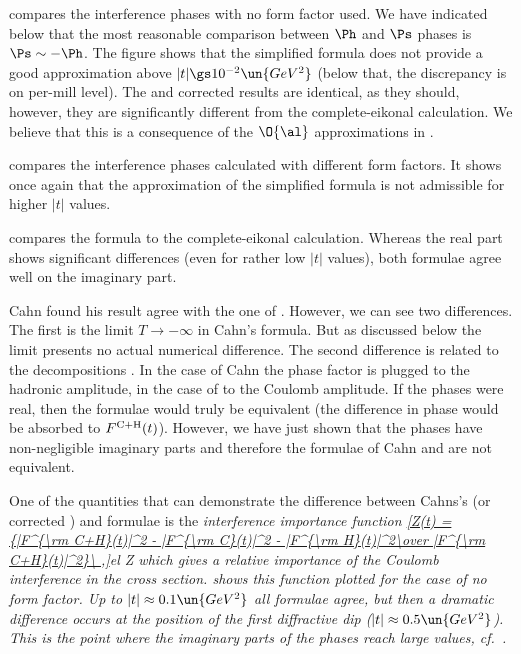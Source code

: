  compares the interference phases with no form factor used. We have indicated below  that the most reasonable comparison between $\Ph$ and $\Ps$ phases is $\Ps \sim - \Ph$. The figure shows that the simplified \WY{} formula does not provide a good approximation above $|t| \gs 10^{-2}\un{GeV^2}$ (below that, the discrepancy is on per-mill level). The \WY{} and corrected \KL{} results are identical, as they should, however, they are significantly different from the complete-eikonal calculation. We believe that this is a consequence of the $\O{\al}$ approximations in .


 compares the interference phases calculated with different form factors. It shows once again that the approximation of the simplified \WaY{} formula is not admissible for higher $|t|$ values.

 compares the \KL{} formula to the complete-eikonal calculation. Whereas the real part shows significant differences (even for rather low $|t|$ values), both formulae agree well on the imaginary part.



Cahn found his result  agree with the one of \WY{} . However, we can see two differences. The first is the limit $T\to -\infty$ in Cahn's formula. But as discussed below  the limit presents no actual numerical difference. The second difference is related to the decompositions . In the case of Cahn the phase factor is plugged to the hadronic amplitude, in the case of \WaY{} to the Coulomb amplitude. If the phases were real, then the formulae would truly be equivalent (the difference in phase would be absorbed to $F^{\rm C+H}(t)$). However, we have just shown that the phases have non-negligible imaginary parts and therefore the formulae of Cahn  and \WY{}  are not equivalent.

One of the quantities that can demonstrate the difference between Cahns's (or corrected \KL) and \WY{} formulae is the \em{interference importance} function
\eqref{Z(t) = {|F^{\rm C+H}(t)|^2 - |F^{\rm C}(t)|^2 - |F^{\rm H}(t)|^2\over |F^{\rm C+H}(t)|^2}\ ,}{el Z}
which gives a relative importance of the Coulomb interference in the cross section.  shows this function plotted for the case of no form factor. Up to $|t| \approx 0.1\un{GeV^2}$ all formulae agree, but then a dramatic difference occurs at the position of the first diffractive dip ($|t|\approx 0.5\un{GeV^2}$). This is the point where the imaginary parts of the phases reach large values, cf.~.

